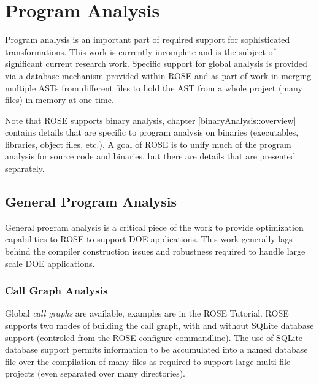 \chapter{Program Analysis}

\label{ProgramAnalysis}


Program analysis is an important part of required support for sophisticated 
transformations. This work is currently incomplete and is
the subject of significant current research work.  Specific support for global analysis 
is provided via a database mechanism provided within ROSE and as part of work
in merging multiple ASTs from different files to hold the AST from a whole project
(many files) in memory at one time.

Note that ROSE supports binary analysis, chapter \ref{binaryAnalysis::overview}
contains details that are specific to program analysis on binaries (executables,
libraries, object files, etc.).
A goal of ROSE is to unify much of the program analysis for source code and binaries, 
but there are details that are presented separately.

\section{General Program Analysis}

   General program analysis is a critical piece of the work to
provide optimization capabilities to ROSE to support DOE applications.
This work generally lags behind the compiler construction issues
and robustness required to handle large scale DOE applications.

\subsection{Call Graph Analysis}

   Global {\it call graphs} are available, examples are in the ROSE Tutorial.
ROSE supports two modes of building the call graph, with and without SQLite 
database support (controled from the ROSE configure commandline). The use of SQLite
database support permits information to be accumulated into a named database file
over the compilation of many files as required to support large multi-file projects
(even separated over many directories).

